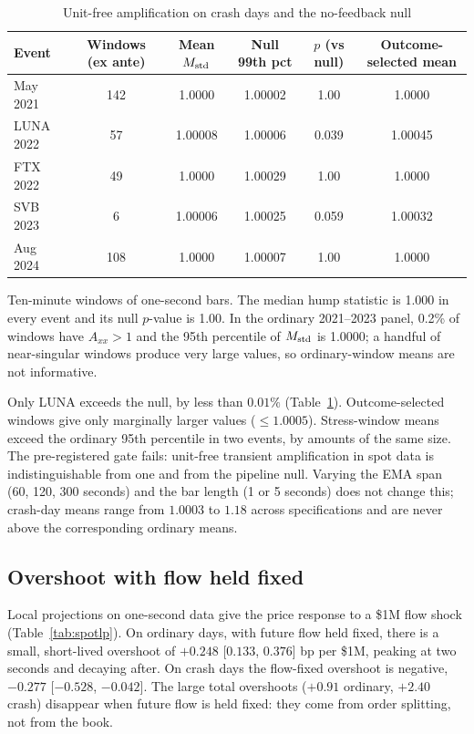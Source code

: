 \documentclass[12pt]{article}
\theoremstyle{definition}
\theoremstyle{remark}
\begin{document}
\begin{table}[t]\centering\small
\begin{threeparttable}
\caption{Unit-free amplification on crash days and the no-feedback null}\label{tab:spotnull}
\begin{tabular}{lccccc}
\toprule
Event & Windows (ex ante) & Mean $M_{\rm std}$ & Null 99th pct & $p$ (vs null) & Outcome-selected mean\\
\midrule
May 2021 & 142 & 1.0000 & 1.00002 & 1.00 & 1.0000\\
LUNA 2022 & 57 & 1.00008 & 1.00006 & 0.039 & 1.00045\\
FTX 2022 & 49 & 1.0000 & 1.00029 & 1.00 & 1.0000\\
SVB 2023 & 6 & 1.00006 & 1.00025 & 0.059 & 1.00032\\
Aug 2024 & 108 & 1.0000 & 1.00007 & 1.00 & 1.0000\\
\bottomrule
\end{tabular}
\begin{tablenotes}\footnotesize\item Ten-minute windows of one-second bars. The median hump statistic is 1.000 in every event and its null $p$-value is 1.00. In the ordinary 2021--2023 panel, 0.2\% of windows have $A_{xx}>1$ and the 95th percentile of $M_{\rm std}$ is 1.0000; a handful of near-singular windows produce very large values, so ordinary-window means are not informative. \end{tablenotes}
\end{threeparttable}
\end{table}

Only LUNA exceeds the null, by less than $0.01\%$ (Table~\ref{tab:spotnull}). Outcome-selected windows give only marginally larger values ($\le1.0005$). Stress-window means exceed the ordinary 95th percentile in two events, by amounts of the same size. The pre-registered gate fails: unit-free transient amplification in spot data is indistinguishable from one and from the pipeline null. Varying the EMA span (60, 120, 300 seconds) and the bar length (1 or 5 seconds) does not change this; crash-day means range from $1.0003$ to $1.18$ across specifications and are never above the corresponding ordinary means.

\subsection{Overshoot with flow held fixed}
Local projections on one-second data give the price response to a \$1M flow shock (Table~\ref{tab:spotlp}). On ordinary days, with future flow held fixed, there is a small, short-lived overshoot of $+0.248$ [$0.133$, $0.376$] bp per \$1M, peaking at two seconds and decaying after. On crash days the flow-fixed overshoot is negative, $-0.277$ [$-0.528$, $-0.042$]. The large total overshoots ($+0.91$ ordinary, $+2.40$ crash) disappear when future flow is held fixed: they come from order splitting, not from the book.
\end{document}
